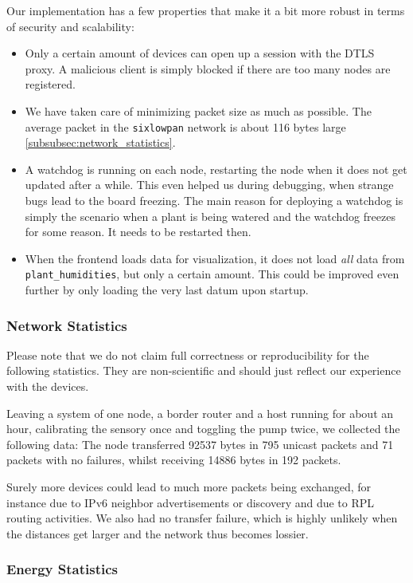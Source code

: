 \documentclass[acmtog, language=english, nonacm]{acmart}
\begin{document}
    Our implementation has a few properties that make it a bit more robust in terms of security and scalability:
    \begin{itemize}
        \item Only a certain amount of devices can open up a session with the DTLS proxy. A malicious client is simply blocked if there are too many nodes are registered.
        \item We have taken care of minimizing packet size as much as possible. The average packet in the \texttt{sixlowpan} network is about 116 bytes large \cref{subsubsec:network_statistics}.
        \item A watchdog is running on each node, restarting the node when it does not get updated after a while. This even helped us during debugging, when strange bugs lead to the board freezing. The main reason for deploying a watchdog is simply the scenario when a plant is being watered and the watchdog freezes for some reason. It needs to be restarted then.
        \item When the frontend loads data for visualization, it does not load \emph{all} data from \texttt{plant\_humidities}, but only a certain amount. This could be improved even further by only loading the very last datum upon startup.
    \end{itemize}

    \label{subsubsec:network_statistics} \subsubsection{Network Statistics}

    Please note that we do not claim full correctness or reproducibility for the following statistics. They are non-scientific and should just reflect our experience with the devices.

    Leaving a system of one node, a border router and a host running for about an hour, calibrating the sensory once and toggling the pump twice, we collected the following data: The node transferred 92537 bytes in 795 unicast packets and 71 packets with no failures, whilst receiving 14886 bytes in 192 packets.

    Surely more devices could lead to much more packets being exchanged, for instance due to IPv6 neighbor advertisements or discovery and due to RPL routing activities. We also had no transfer failure, which is highly unlikely when the distances get larger and the network thus becomes lossier.

    \subsubsection{Energy Statistics}
\end{document}
